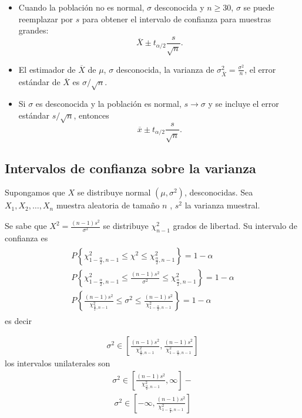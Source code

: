 \begin{itemize}
\begin{enumerate}
\begin{itemize}
\item Cuando la poblaci\'on no es normal, $\sigma$ desconocida y $n\geq30$, $\sigma$ se puede reemplazar por $s$ para obtener el intervalo de confianza para muestras grandes:
$$\overline{X}\pm t_{\alpha/2}\frac{s}{\sqrt{n}}.$$

\item El estimador de $\overline{X}$ de $\mu$,  $\sigma$ desconocida, la varianza de $\sigma_{\overline{X}}^{2}=\frac{\sigma^{2}}{n}$, el error est\'andar de $\overline{X}$ es $\sigma/\sqrt{n}$.

\item Si $\sigma$ es desconocida y la poblaci\'on es normal, $s\rightarrow\sigma$ y se incluye el error est\'andar $s/\sqrt{n}$, entonces $$\overline{x}\pm t_{\alpha/2}\frac{s}{\sqrt{n}}.$$
\end{itemize}
\subsection*{Intervalos de confianza sobre la varianza}

Supongamos que  $X$ se distribuye normal $\left(\mu,\sigma^{2}\right)$, desconocidas. Sea $X_{1},X_{2},\ldots,X_{n}$ muestra aleatoria de tama\~no $n$ , $s^{2}$ la varianza muestral.

Se sabe que $X^{2}=\frac{\left(n-1\right)s^{2}}{\sigma^{2}}$ se distribuye $\chi^{2}_{n-1}$ grados de libertad. Su intervalo de confianza es
\begin{eqnarray}
\begin{array}{l}
P\left\{\chi^{2}_{1-\frac{\alpha}{2},n-1}\leq\chi^{2}\leq\chi^{2}_{\frac{\alpha}{2},n-1}\right\}=1-\alpha\\
P\left\{\chi^{2}_{1-\frac{\alpha}{2},n-1}\leq\frac{\left(n-1\right)s^{2}}{\sigma^{2}}\leq\chi^{2}_{\frac{\alpha}{2},n-1}\right\}=1-\alpha\\
P\left\{\frac{\left(n-1\right)s^{2}}{\chi^{2}_{\frac{\alpha}{2},n-1}}\leq\sigma^{2}\leq\frac{\left(n-1\right)s^{2}}{\chi^{2}_{1-\frac{\alpha}{2},n-1}}\right\}=1-\alpha
\end{array}
\end{eqnarray}
es decir

\begin{eqnarray}
\sigma^{2}\in\left[\frac{\left(n-1\right)s^{2}}{\chi^{2}_{\frac{\alpha}{2},n-1}},\frac{\left(n-1\right)s^{2}}{\chi^{2}_{1-\frac{\alpha}{2},n-1}}\right]
\end{eqnarray}
los intervalos unilaterales son
\begin{eqnarray}
\sigma^{2}\in\left[\frac{\left(n-1\right)s^{2}}{\chi^{2}_{\frac{\alpha}{2},n-1}},\infty\right]-
\end{eqnarray}
\begin{eqnarray}
\sigma^{2}\in\left[-\infty,\frac{\left(n-1\right)s^{2}}{\chi^{2}_{1-\frac{\alpha}{2},n-1}}\right]
\end{eqnarray}


\end{enumerate}
\end{itemize}
